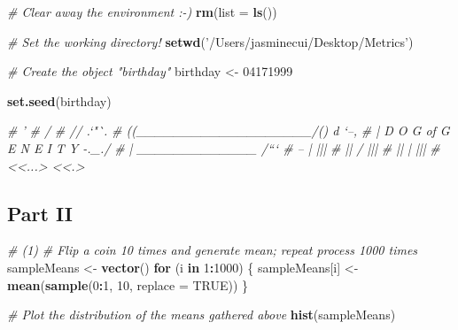 \documentclass[]{article}
\newenvironment{Shaded}{\begin{snugshade}}{\end{snugshade}}
\newcommand{\KeywordTok}[1]{\textcolor[rgb]{0.13,0.29,0.53}{\textbf{#1}}}
\newcommand{\DataTypeTok}[1]{\textcolor[rgb]{0.13,0.29,0.53}{#1}}
\newcommand{\DecValTok}[1]{\textcolor[rgb]{0.00,0.00,0.81}{#1}}
\newcommand{\StringTok}[1]{\textcolor[rgb]{0.31,0.60,0.02}{#1}}
\newcommand{\CommentTok}[1]{\textcolor[rgb]{0.56,0.35,0.01}{\textit{#1}}}
\newcommand{\OtherTok}[1]{\textcolor[rgb]{0.56,0.35,0.01}{#1}}
\newcommand{\ControlFlowTok}[1]{\textcolor[rgb]{0.13,0.29,0.53}{\textbf{#1}}}
\newcommand{\OperatorTok}[1]{\textcolor[rgb]{0.81,0.36,0.00}{\textbf{#1}}}
\newcommand{\NormalTok}[1]{#1}
\begin{document}
\begin{Shaded}
\begin{Highlighting}[]
\CommentTok{# Clear away the environment :-)}
\KeywordTok{rm}\NormalTok{(}\DataTypeTok{list =} \KeywordTok{ls}\NormalTok{())}

\CommentTok{# Set the working directory! }
\KeywordTok{setwd}\NormalTok{(}\StringTok{'/Users/jasminecui/Desktop/Metrics'}\NormalTok{)}

\CommentTok{# Create the object "birthday"}
\NormalTok{birthday <-}\StringTok{ }\DecValTok{04171999}

\KeywordTok{set.seed}\NormalTok{(birthday)}

\CommentTok{#    '}
\CommentTok{#    /}
\CommentTok{#    //                   .`"`.}
\CommentTok{#    ((___________________/() d `--,}
\CommentTok{#    | D O G of G E N E I T Y  -._./}
\CommentTok{#   |     _____________   /```^^`}
\CommentTok{#    --   |             |||}
\CommentTok{#    || /              |||}
\CommentTok{#    || |              |||}
\CommentTok{#    <<...>            <<.>}
\end{Highlighting}
\end{Shaded}

\subsection{Part II}\label{part-ii}

\begin{Shaded}
\begin{Highlighting}[]
\CommentTok{# (1)}
\CommentTok{# Flip a coin 10 times and generate mean; repeat process 1000 times }
\NormalTok{sampleMeans <-}\StringTok{ }\KeywordTok{vector}\NormalTok{() }
\ControlFlowTok{for}\NormalTok{ (i }\ControlFlowTok{in} \DecValTok{1}\OperatorTok{:}\DecValTok{1000}\NormalTok{) \{}
\NormalTok{  sampleMeans[i] <-}\StringTok{ }\KeywordTok{mean}\NormalTok{(}\KeywordTok{sample}\NormalTok{(}\DecValTok{0}\OperatorTok{:}\DecValTok{1}\NormalTok{, }\DecValTok{10}\NormalTok{, }\DataTypeTok{replace =} \OtherTok{TRUE}\NormalTok{))}
\NormalTok{\}}

\CommentTok{# Plot the distribution of the means gathered above }
\KeywordTok{hist}\NormalTok{(sampleMeans)}
\end{Highlighting}
\end{Shaded}
\end{document}
